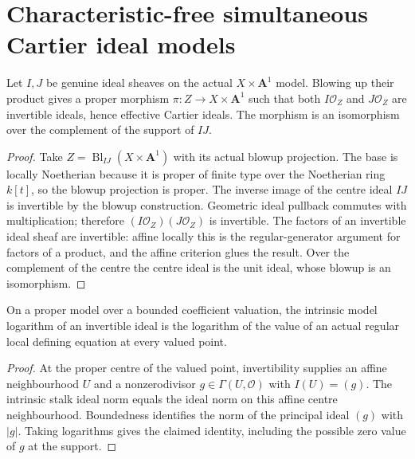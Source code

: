 \section{Characteristic-free simultaneous Cartier ideal models}

\begin{lemma}
\label{lem:pl-product-blowup-cartier}
\leanok
Let $I,J$ be genuine ideal sheaves on the actual $X\times\mathbf A^1$ model.
Blowing up their product gives a proper morphism $\pi:Z\to X\times\mathbf A^1$
such that both $I\mathcal O_Z$ and $J\mathcal O_Z$ are invertible ideals,
hence effective Cartier ideals.  The morphism is an isomorphism over the
complement of the support of $IJ$.
\end{lemma}
\begin{proof}
Take $Z=\operatorname{Bl}_{IJ}(X\times\mathbf A^1)$ with its actual blowup
projection.  The base is locally Noetherian because it is proper of finite
type over the Noetherian ring $k[t]$, so the blowup projection is proper.
The inverse image of the centre ideal $IJ$ is invertible by the blowup
construction.  Geometric ideal pullback commutes with multiplication;
therefore $(I\mathcal O_Z)(J\mathcal O_Z)$ is invertible.  The factors of
an invertible ideal sheaf are invertible: affine locally this is the
regular-generator argument for factors of a product, and the affine
criterion glues the result.  Over the complement of the centre the centre
ideal is the unit ideal, whose blowup is an isomorphism.
\end{proof}

\begin{lemma}
\label{lem:pl-cartier-model-log}
\leanok
On a proper model over a bounded coefficient valuation, the intrinsic
model logarithm of an invertible ideal is the logarithm of the value of
an actual regular local defining equation at every valued point.
\end{lemma}
\begin{proof}
At the proper centre of the valued point, invertibility supplies an
affine neighbourhood $U$ and a nonzerodivisor $g\in\Gamma(U,\mathcal O)$
with $I(U)=(g)$.  The intrinsic stalk ideal norm equals the ideal norm on
this affine centre neighbourhood.  Boundedness identifies the norm of
the principal ideal $(g)$ with $|g|$.  Taking logarithms gives the claimed
identity, including the possible zero value of $g$ at the support.
\end{proof}

